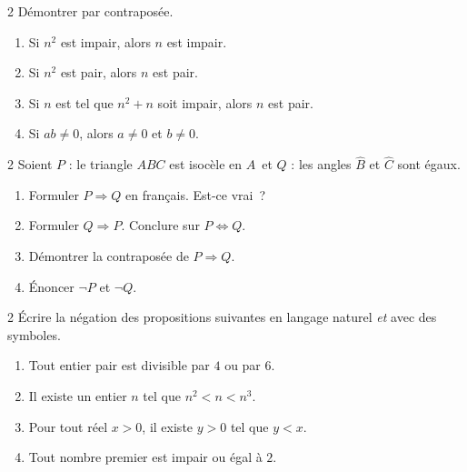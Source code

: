 \begin{exo}{2}
D\'emontrer par contrapos\'ee.
\begin{enumerate}
  \item Si $n^2$ est impair, alors $n$ est impair.
  \item Si $n^2$ est pair, alors $n$ est pair.
  \item Si $n$ est tel que $n^2 + n$ soit impair, alors $n$ est pair.
  \item Si $ab \ne 0$, alors $a \ne 0$ et $b \ne 0$.
\end{enumerate}
\end{exo}

\begin{exo}{2}
Soient $P$ : \og le triangle $ABC$ est isoc\`ele en $A$\fg\ et
$Q$ : \og les angles $\hat B$ et $\hat C$ sont \'egaux\fg.
\begin{enumerate}
  \item Formuler $P \Rightarrow Q$ en fran\c cais. Est-ce vrai~?
  \item Formuler $Q \Rightarrow P$. Conclure sur $P \Leftrightarrow Q$.
  \item D\'emontrer la contrapos\'ee de $P \Rightarrow Q$.
  \item \'Enoncer $\lnot P$ et $\lnot Q$.
\end{enumerate}
\end{exo}

\begin{exo}{2}
\'Ecrire la n\'egation des propositions suivantes en langage naturel
\emph{et} avec des symboles.
\begin{enumerate}
  \item \og Tout entier pair est divisible par $4$ ou par $6$.\fg
  \item \og Il existe un entier $n$ tel que $n^2 < n < n^3$.\fg
  \item \og Pour tout r\'eel $x > 0$, il existe $y > 0$ tel que $y < x$.\fg
  \item \og Tout nombre premier est impair ou \'egal \`a $2$.\fg
\end{enumerate}
\end{exo}

